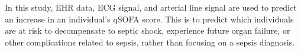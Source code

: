 In this study, EHR data, ECG signal, and arterial line signal are used to predict an increase in an individual's qSOFA score. This is to predict which individuals are at risk to decompensate to septic shock, experience future organ failure, or other complications related to sepsis, rather than focusing on a sepsis diagnosis. %

